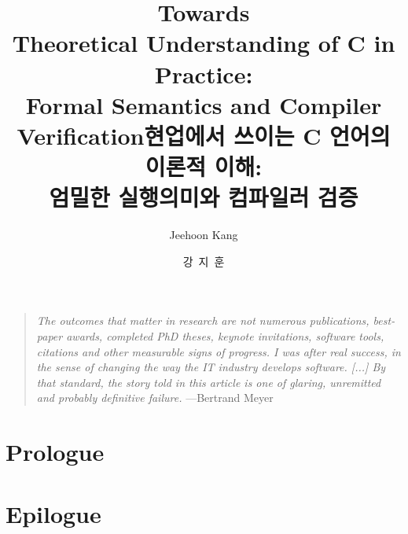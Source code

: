 \documentclass[oneside,phd]{snuthesis}
\title{Towards \\ Theoretical Understanding of C in Practice: \\ Formal Semantics and Compiler Verification}
\title*{현업에서 쓰이는 C 언어의 이론적 이해: \\ 엄밀한 실행의미와 컴파일러 검증}
\author{Jeehoon Kang}
\author*{강~지~훈} %
\begin{document}
\makefrontcover
\makefrontcover
\makeapproval

\cleardoublepage
{}



\begin{quotation}
  \emph{The outcomes that matter in research are not numerous publications, best-paper awards,
    completed PhD theses, keynote invitations, software tools, citations and other measurable signs
    of progress.  I was after real success, in the sense of changing the way the IT industry
    develops software. [...] By that standard, the story told in this article is one of glaring,
    unremitted and probably definitive failure.} \hfill{}---Bertrand Meyer~\cite{bertrand-meyer}\ \phantom{ }
\end{quotation}



\tableofcontents
\listoffigures
\listoftables

\cleardoublepage
{}


\chapter{Prologue}
\label{chap:prologue}





% 
% 
% 
% 






% 
% 
% 
% 
% 
% 


\chapter{Epilogue}
\label{chap:epilogue}






% 






\end{document}
